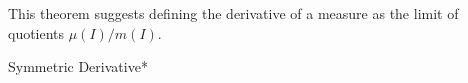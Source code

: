 This theorem suggests defining the derivative of a measure as the limit of quotients \(\mu(I) / m(I)\). 

\begin{definition}{Symmetric Derivative}*
\end{definition}



